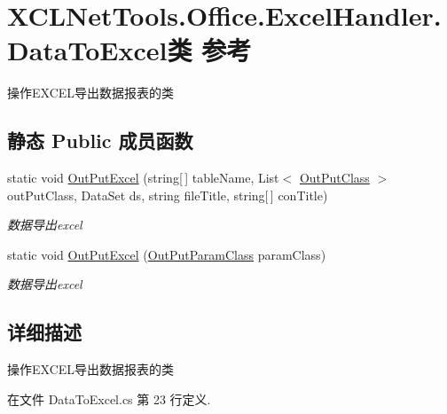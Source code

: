 \hypertarget{class_x_c_l_net_tools_1_1_office_1_1_excel_handler_1_1_data_to_excel}{\section{X\-C\-L\-Net\-Tools.\-Office.\-Excel\-Handler.\-Data\-To\-Excel类 参考}
\label{class_x_c_l_net_tools_1_1_office_1_1_excel_handler_1_1_data_to_excel}
}


操作\-E\-X\-C\-E\-L导出数据报表的类  


\subsection*{静态 Public 成员函数}
\begin{DoxyCompactItemize}
\item 
static void \hyperlink{class_x_c_l_net_tools_1_1_office_1_1_excel_handler_1_1_data_to_excel_abf1db6edf6323d692e1fde4f20e49885}{Out\-Put\-Excel} (string\mbox{[}$\,$\mbox{]} table\-Name, List$<$ \hyperlink{class_x_c_l_net_tools_1_1_entity_1_1_office_1_1_excel_handler_1_1_out_put_class}{Out\-Put\-Class} $>$ out\-Put\-Class, Data\-Set ds, string file\-Title, string\mbox{[}$\,$\mbox{]} con\-Title)
\begin{DoxyCompactList}\small\item\em 数据导出excel \end{DoxyCompactList}\item 
static void \hyperlink{class_x_c_l_net_tools_1_1_office_1_1_excel_handler_1_1_data_to_excel_a3759ee10656502d21192b36d2e29a9b3}{Out\-Put\-Excel} (\hyperlink{class_x_c_l_net_tools_1_1_entity_1_1_office_1_1_excel_handler_1_1_out_put_param_class}{Out\-Put\-Param\-Class} param\-Class)
\begin{DoxyCompactList}\small\item\em 数据导出excel \end{DoxyCompactList}\end{DoxyCompactItemize}


\subsection{详细描述}
操作\-E\-X\-C\-E\-L导出数据报表的类 



在文件 Data\-To\-Excel.\-cs 第 23 行定义.



